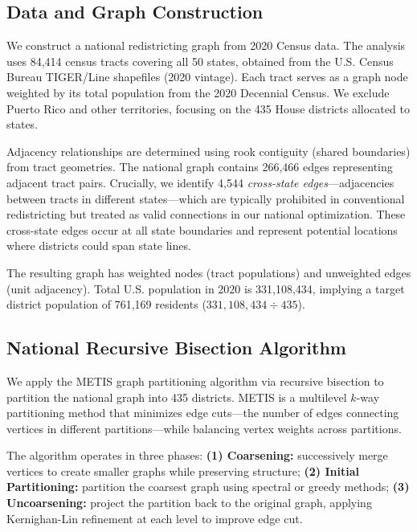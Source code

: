 
\subsection{Data and Graph Construction}

We construct a national redistricting graph from 2020 Census data. The analysis uses 84,414 census tracts covering all 50 states, obtained from the U.S. Census Bureau TIGER/Line shapefiles (2020 vintage). Each tract serves as a graph node weighted by its total population from the 2020 Decennial Census. We exclude Puerto Rico and other territories, focusing on the 435 House districts allocated to states.

Adjacency relationships are determined using rook contiguity (shared boundaries) from tract geometries. The national graph contains 266,466 edges representing adjacent tract pairs. Crucially, we identify 4,544 \textit{cross-state edges}---adjacencies between tracts in different states---which are typically prohibited in conventional redistricting but treated as valid connections in our national optimization. These cross-state edges occur at all state boundaries and represent potential locations where districts could span state lines.

The resulting graph has weighted nodes (tract populations) and unweighted edges (unit adjacency). Total U.S. population in 2020 is 331,108,434, implying a target district population of 761,169 residents ($ 331,108,434 \div 435 $).

\subsection{National Recursive Bisection Algorithm}

We apply the METIS graph partitioning algorithm \citep{karypis1998fast} via recursive bisection to partition the national graph into 435 districts. METIS is a multilevel $k$-way partitioning method that minimizes edge cuts---the number of edges connecting vertices in different partitions---while balancing vertex weights across partitions.

The algorithm operates in three phases: \textbf{(1) Coarsening:} successively merge vertices to create smaller graphs while preserving structure; \textbf{(2) Initial Partitioning:} partition the coarsest graph using spectral or greedy methods; \textbf{(3) Uncoarsening:} project the partition back to the original graph, applying Kernighan-Lin refinement at each level to improve edge cut.

